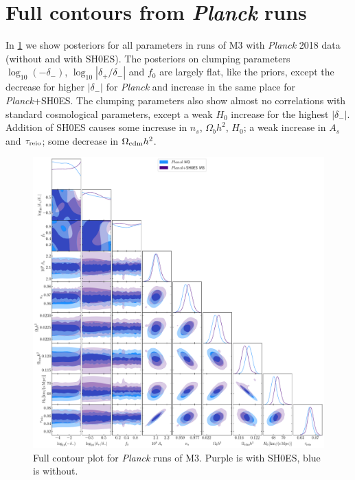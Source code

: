 \section{Full contours from {\it Planck} runs}
\label{sec:fullcontours}

In \cref{fig:planckSH0ES-fullcontours} we show posteriors for all parameters in runs of M3 with {\it Planck} 2018 data (without and with SH0ES).
The posteriors on clumping parameters $\log_{10}\left(-\delta_-\right)$, $\log_{10}\left|\delta_+/\delta_-\right|$ and $f_0$ are largely flat, like the priors, except the decrease for higher $|\delta_-|$ for {\it Planck} and increase in the same place for {\it Planck}+SH0ES.
The clumping parameters also show almost no correlations with standard cosmological parameters, except a weak $H_0$ increase for the highest $|\delta_-|$.
Addition of SH0ES causes some increase in $n_s$, $\Omega_bh^2$, $H_0$; a weak increase in $A_s$ and $\tau_{\rm reio}$; some decrease in $\Omega_{\rm cdm}h^2$.

\begin{figure}[ht!]
\includegraphics[width=\textwidth]{img/planckSH0ES-fullcontours.pdf}
\caption[Full contour plot for {\it Planck} runs of the clumping model.]{Full contour plot for {\it Planck} runs of M3. Purple is with SH0ES, blue is without.}
\label{fig:planckSH0ES-fullcontours}
\end{figure}

